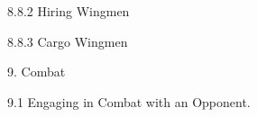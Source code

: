 \documentclass{article}
\begin{document}
8.8.2 Hiring Wingmen   











































































































8.8.3 Cargo Wingmen  



9. Combat  



9.1 Engaging in Combat with an Opponent. 
\end{document}

